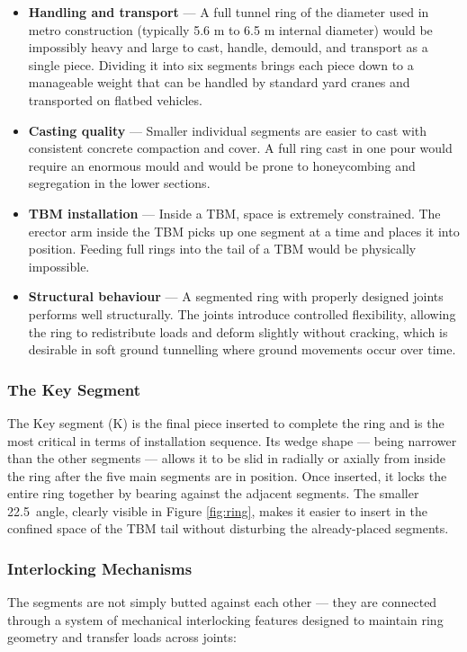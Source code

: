 \begin{itemize}
    \item \textbf{Handling and transport} --- A full tunnel ring of the diameter used in metro construction (typically 5.6 m to 6.5 m internal diameter) would be impossibly heavy and large to cast, handle, demould, and transport as a single piece. Dividing it into six segments brings each piece down to a manageable weight that can be handled by standard yard cranes and transported on flatbed vehicles.
    \item \textbf{Casting quality} --- Smaller individual segments are easier to cast with consistent concrete compaction and cover. A full ring cast in one pour would require an enormous mould and would be prone to honeycombing and segregation in the lower sections.
    \item \textbf{TBM installation} --- Inside a TBM, space is extremely constrained. The erector arm inside the TBM picks up one segment at a time and places it into position. Feeding full rings into the tail of a TBM would be physically impossible.
    \item \textbf{Structural behaviour} --- A segmented ring with properly designed joints performs well structurally. The joints introduce controlled flexibility, allowing the ring to redistribute loads and deform slightly without cracking, which is desirable in soft ground tunnelling where ground movements occur over time.
\end{itemize}

\subsubsection{The Key Segment}
\par\noindent
The Key segment (K) is the final piece inserted to complete the ring and is the most critical in terms of installation sequence. Its wedge shape --- being narrower than the other segments --- allows it to be slid in radially or axially from inside the ring after the five main segments are in position. Once inserted, it locks the entire ring together by bearing against the adjacent segments. The smaller 22.5\textdegree\ angle, clearly visible in Figure \ref{fig:ring}, makes it easier to insert in the confined space of the TBM tail without disturbing the already-placed segments.

\subsubsection{Interlocking Mechanisms}
\par\noindent
The segments are not simply butted against each other --- they are connected through a system of mechanical interlocking features designed to maintain ring geometry and transfer loads across joints:

